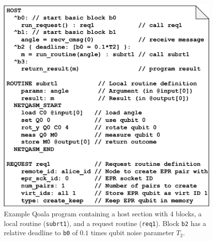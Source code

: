 \begin{figure}%
    \centering
    \includegraphics[width=\columnwidth]{figures/qoala/example_program.png}
    \caption{
        Example Qoala program containing a host section with 4 blocks, a local routine (\texttt{subrt1}),
        and a request routine (\texttt{req1}). Block \texttt{b2} has a relative deadline to \texttt{b0} of $0.1$ times qubit noise parameter $T_2$.
    }
    \label{fig:example_program}
\end{figure}

